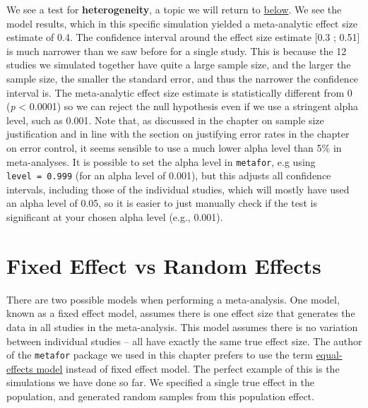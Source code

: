 \documentclass[
  oneside]{krantz}
\begin{document}
We see a test for \textbf{heterogeneity}, a topic we will return to \protect\hyperlink{heterogeneity}{below}. We see the model results, which in this specific simulation yielded a meta-analytic effect size estimate of 0.4. The confidence interval around the effect size estimate {[}0.3 ; 0.51{]} is much narrower than we saw before for a single study. This is because the 12 studies we simulated together have quite a large sample size, and the larger the sample size, the smaller the standard error, and thus the narrower the confidence interval is. The meta-analytic effect size estimate is statistically different from 0 (\emph{p} \textless{} 0.0001) so we can reject the null hypothesis even if we use a stringent alpha level, such as 0.001. Note that, as discussed in the chapter on sample size justification and in line with the section on justifying error rates in the chapter on error control, it seems sensible to use a much lower alpha level than 5\% in meta-analyses. It is possible to set the alpha level in \texttt{metafor}, e.g using \texttt{level\ =\ 0.999} (for an alpha level of 0.001), but this adjusts all confidence intervals, including those of the individual studies, which will mostly have used an alpha level of 0.05, so it is easier to just manually check if the test is significant at your chosen alpha level (e.g., 0.001).

\hypertarget{fixed-effect-vs-random-effects}{%
\section{Fixed Effect vs Random Effects}\label{fixed-effect-vs-random-effects}}

There are two possible models when performing a meta-analysis. One model, known as a fixed effect model, assumes there is one effect size that generates the data in all studies in the meta-analysis. This model assumes there is no variation between individual studies -- all have exactly the same true effect size. The author of the \texttt{metafor} package we used in this chapter prefers to use the term \href{https://wviechtb.github.io/metafor/reference/misc-models.html}{equal-effects model} instead of fixed effect model. The perfect example of this is the simulations we have done so far. We specified a single true effect in the population, and generated random samples from this population effect.
\end{document}
